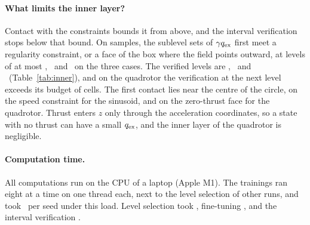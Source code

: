 \paragraph{What limits the inner layer?} Contact with the constraints bounds it from above, and the interval verification stops below that bound. On samples, the sublevel sets of $\gamma q_{\mathrm{ex}}$ first meet a regularity constraint, or a face of the box where the field points outward, at levels of at most \resContactCirc, \resContactSin\ and \resContactQuad\ on the three cases. The verified levels are \resCICirc, \resCISin\ and \resCIQuad\ (Table~\ref{tab:inner}), and on the quadrotor the verification at the next level exceeds its budget of cells. The first contact lies near the centre of the circle, on the speed constraint for the sinusoid, and on the zero-thrust face for the quadrotor. Thrust enters $z$ only through the acceleration coordinates, so a state with no thrust can have a small $q_{\mathrm{ex}}$, and the inner layer of the quadrotor is negligible.

\paragraph{Computation time.} All computations run on the CPU of a laptop (Apple M1). The trainings ran eight at a time on one thread each, next to the level selection of other runs, and took \resTimeTrain\ per seed under this load. Level selection took \resTimeCert, fine-tuning \resTimeRepair, and the interval verification \resTimeInner.

